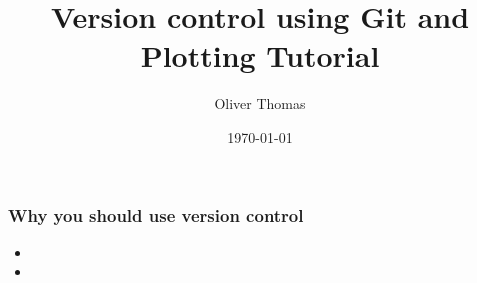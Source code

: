 \documentclass{beamer}
\title{Version control using Git and Plotting Tutorial}
\author{Oliver Thomas}
\institute{Quantum Engineering CDT \\ University of Bristol}
\date{\today}
\begin{document}
\frame{\titlepage}

\begin{frame}
\frametitle{Why you should use version control}
\begin{itemize}
\item
\item
\end{itemize}
\end{frame}


\begin{frame}
\frametitle{}
\end{frame}
\end{document}
